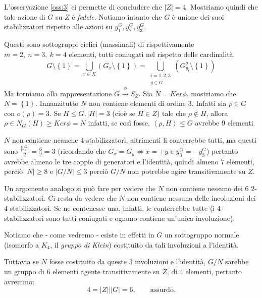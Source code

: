 L'osservazione \ref{oss:3} ci permette di concludere che $\left|Z\right| = 4$. Mostriamo quindi che tale azione di $G$ su $Z$
\`e \emph{fedele}.
Notiamo intanto che $G$ \`e unione dei suoi stabilizzatori rispetto alle azioni su $y_1^G,y_2^G,y_3^G$.

Questi sono sottogruppi ciclici (massimali) di rispettivamente $m=2,\ n=3,\ k=4$ elementi, tutti coniugati nel rispetto delle cardinalit\`a.
\begin{equation*}
G\setminus\left\{1\right\} = \underset{x\in X}{\overset{\cdot}\bigcup}(G_x\setminus\left\{1\right\})=
\overset{\cdot}{\underset{\substack{i=1,2,3\\g\in G}}\bigcup}(G_{y_i}^g\setminus\left\{1\right\})
\end{equation*}
Ma torniamo alla rappresentazione $G\overset\phi\longrightarrow S_Z$.
Sia $N=Ker\phi$, mostriamo che $N=\left\{1\right\}$.
Innanzitutto $N$ non contiene elementi di ordine $3$. Infatti sia $\rho\in G$ con
$o(\rho)=3$. Se $H\leq G, \left|H\right|=3$ (cio\`e se $H\in Z$) tale che $\rho\notin H$, allora $\rho\in N_G(H)\geq Ker\phi=N$
infatti, se cos\`i fosse, $\left<\rho,H\right>\leq G$ avrebbe $9$ elementi.

$N$ non contiene neanche $4$-stabilizzatori, altrimenti li conterrebbe tutti, ma questi sono $\frac{\left|y_3^G\right|}{2}=\frac{6}{2}=3$
(ricordando che $G_x=G_y \Leftrightarrow x = \pm y$ e $y_3^G=-y_3^G$) pertanto avrebbe almeno le tre coppie di generatori e l'identit\`a,
quindi almeno $7$ elementi, perci\`o $\left|N\right|\geq 8$ e $\left|G/N\right|\leq 3$ perci\`o $G/N$ non potrebbe agire transitivamente
su $Z$.

Un argomento analogo si pu\`o fare per vedere che $N$ non contiene nessuno dei $6$ $2$-stabilizzatori.
Ci resta da vedere che $N$ non contiene nessuna delle incoluzioni dei $4$-stabilizzatori. Se ne contenesse una,
infatti, le conterrebbe tutte (i $4$-stabilizzatori sono tutti coniugati e ognuno contiene un'unica involuzione).

Notiamo che - come vedremo - esiste in effetti in $G$ un sottogruppo normale (isomorfo a $K_4$, il \emph{gruppo di Klein}) costituito
da tali involuzioni a l'identit\`a.

Tuttavia se $N$ fosse costituito da queste $3$ involuzioni e l'identit\`a, $G/N$ sarebbe un gruppo di $6$ elementi agente
transitivamente su $Z$, di $4$ elementi, pertanto avremmo:
\begin{equation*}
4=\left|Z\right|\big|\left|G\right|=6,\qquad\text{assurdo.}
\end{equation*}

